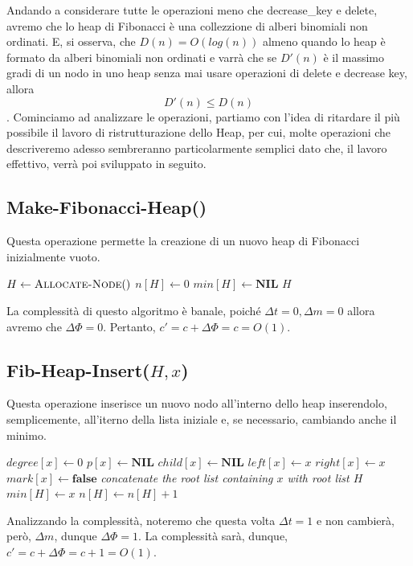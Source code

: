 Andando a considerare tutte le operazioni meno che decrease\_key e delete, avremo che lo heap di Fibonacci è una collezzione di alberi binomiali non ordinati. E, si osserva, che $D(n) = O(log(n))$ almeno quando lo heap è formato da alberi binomiali non ordinati e varrà che se $D'(n)$ è il massimo gradi di un nodo in uno heap senza mai usare operazioni di delete e decrease key, allora \[D'(n)\leq D(n)\].
Cominciamo ad analizzare le operazioni, partiamo con l'idea di ritardare il più possibile il lavoro di ristrutturazione dello Heap, per cui, molte operazioni che descriveremo adesso sembreranno particolarmente semplici dato che, il lavoro effettivo, verrà poi sviluppato in seguito.
\subsection{Make-Fibonacci-Heap()}
Questa operazione permette la creazione di un nuovo heap di Fibonacci inizialmente vuoto. 

\begin{algorithm}[H]
\caption{MAKE-FIBONACCI-HEAP()}
\begin{algorithmic}[1]
    \State $H \gets \textsc{Allocate-Node}()$
    \State $n[H] \gets 0$
    \State $min[H] \gets \textbf{NIL}$
    \State \Return $H$
\end{algorithmic}
\end{algorithm}
La complessità di questo algoritmo è banale, poiché $\Delta t = 0,\Delta m =0$ allora avremo che $\Delta\Phi=0$. Pertanto, $c'=c+\Delta\Phi=c=O(1)$.

\subsection{Fib-Heap-Insert($H,x$)}
Questa operazione inserisce un nuovo nodo all'interno dello heap inserendolo, semplicemente, all'iterno della lista iniziale e, se necessario, cambiando anche il minimo. 
\begin{algorithm}[H]
\caption{FIB-HEAP-INSERT($H, x$)}
\begin{algorithmic}[1]
    \State $degree[x] \gets 0$  
    \State $p[x] \gets \textbf{NIL}$
    \State $child[x] \gets \textbf{NIL}$
    \State $left[x] \gets x$
    \State $right[x] \gets x$
    \State $mark[x] \gets \textbf{false}$
    \State \textit{concatenate the root list containing $x$ with root list $H$}
     
        \State $min[H] \gets x$
    \EndIf
    \State $n[H] \gets n[H] + 1$ 
\end{algorithmic}
\end{algorithm}
Analizzando la complessità, noteremo che questa volta $\Delta t = 1$ e non cambierà, però, $\Delta m$, dunque $\Delta \Phi = 1$. La complessità sarà, dunque, $c'=c+\Delta\Phi=c+1=O(1)$.
